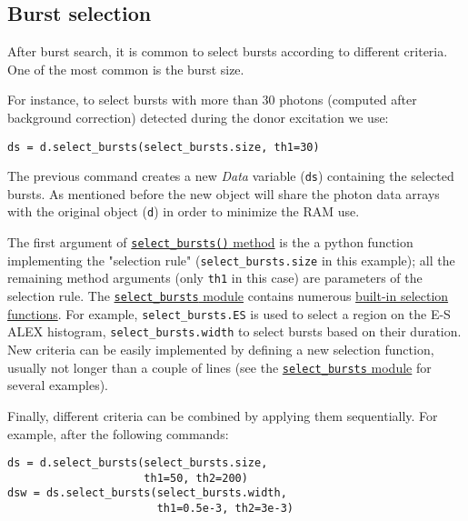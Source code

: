 \subsection{Burst selection}
\label{sec:burstsel}

After burst search, it is common to select bursts according to different
criteria. One of the most common is the burst size.

For instance, to select bursts with more than 30 photons (computed
after background correction) detected during the donor excitation
we use:

\begin{verbatim}
ds = d.select_bursts(select_bursts.size, th1=30)
\end{verbatim}

The previous command creates a new \textit{Data} variable (\verb|ds|) containing
the selected bursts.
As mentioned before the new object will share the photon data
arrays with the original object (\verb|d|) in order to minimize the RAM use.

The first argument of 
\href{http://fretbursts.readthedocs.org/en/latest/data_class.html#burst-selection-methods}{\texttt{select\_bursts()} method}
is the a python function implementing the "selection rule" (\verb|select_bursts.size| in this example);
all the remaining method arguments (only \verb|th1| in this case) are parameters of the selection rule.
The \href{http://fretbursts.readthedocs.org/en/latest/burst_selection.html}{\texttt{select\_bursts} module}
contains numerous
\href{http://fretbursts.readthedocs.org/en/latest/burst_selection.html#module-fretbursts.select_bursts}{built-in selection functions}.
For example,
\verb|select_bursts.ES|
is used to select a region on the E-S ALEX histogram,
\verb|select_bursts.width|
to select bursts based on their duration.
New criteria can be easily implemented by defining a new selection function,
usually not longer than a couple of lines (see the
\href{https://github.com/tritemio/FRETBursts/blob/master/fretbursts/select\_bursts.py}{\texttt{select\_bursts} module} for several examples).

Finally, different criteria can be combined by applying them sequentially.
For example, after the following commands:

\begin{verbatim}
ds = d.select_bursts(select_bursts.size,
                     th1=50, th2=200)
dsw = ds.select_bursts(select_bursts.width,
                       th1=0.5e-3, th2=3e-3)
\end{verbatim}

